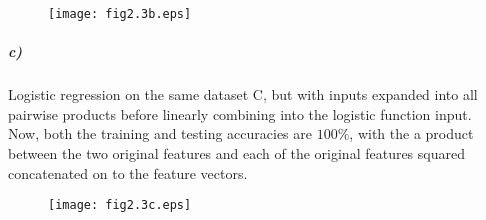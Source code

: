 \documentclass[10pt,letter]{article}
\begin{document}
\begin{figure}[b]
\vspace*{1cm}
\centering
\texttt{[image: fig2.3b.eps]}
\end{figure}

\subparagraph{c)} Logistic regression on the same dataset C, but with inputs expanded into all 
    pairwise products before linearly combining into the logistic function input.\\

Now, both the training and testing accuracies are $100\%$, with the a product between the two 
original features and each of the original features squared concatenated on to the feature vectors.

\begin{figure}[b]
\vspace*{-4cm}
\centering
\texttt{[image: fig2.3c.eps]}
\end{figure}
\end{document}

